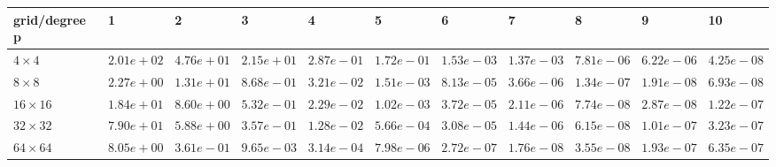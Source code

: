 \begin{tabular}{lllllllllll}
\hline
 grid/degree p   & 1          & 2          & 3          & 4          & 5          & 6          & 7          & 8          & 9          & 10         \\
\hline
 $4 \times 4$    & $2.01e+02$ & $4.76e+01$ & $2.15e+01$ & $2.87e-01$ & $1.72e-01$ & $1.53e-03$ & $1.37e-03$ & $7.81e-06$ & $6.22e-06$ & $4.25e-08$ \\
 $8 \times 8$    & $2.27e+00$ & $1.31e+01$ & $8.68e-01$ & $3.21e-02$ & $1.51e-03$ & $8.13e-05$ & $3.66e-06$ & $1.34e-07$ & $1.91e-08$ & $6.93e-08$ \\
 $16 \times 16$  & $1.84e+01$ & $8.60e+00$ & $5.32e-01$ & $2.29e-02$ & $1.02e-03$ & $3.72e-05$ & $2.11e-06$ & $7.74e-08$ & $2.87e-08$ & $1.22e-07$ \\
 $32 \times 32$  & $7.90e+01$ & $5.88e+00$ & $3.57e-01$ & $1.28e-02$ & $5.66e-04$ & $3.08e-05$ & $1.44e-06$ & $6.15e-08$ & $1.01e-07$ & $3.23e-07$ \\
 $64 \times 64$  & $8.05e+00$ & $3.61e-01$ & $9.65e-03$ & $3.14e-04$ & $7.98e-06$ & $2.72e-07$ & $1.76e-08$ & $3.55e-08$ & $1.93e-07$ & $6.35e-07$ \\
\hline
\end{tabular}